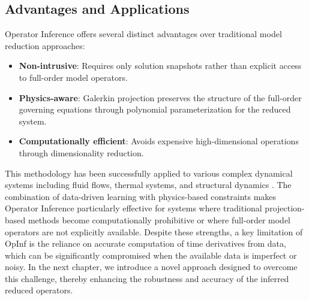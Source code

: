 \subsection*{Advantages and Applications}
Operator Inference offers several distinct advantages over traditional model reduction approaches:
\begin{itemize}
    \item \textbf{Non-intrusive}: Requires only solution snapshots rather than explicit access to full-order model operators.
    \item \textbf{Physics-aware}: Galerkin projection preserves the structure of the full-order governing equations through polynomial parameterization for the reduced system.
    \item \textbf{Computationally efficient}: Avoids expensive high-dimensional operations through dimensionality reduction.  
\end{itemize}

This methodology has been successfully applied to various complex dynamical systems including fluid flows, thermal systems, and structural dynamics \cite{ghattas2021learning,rowley2017model}. The combination of data-driven learning with physics-based constraints makes Operator Inference particularly effective for systems where traditional projection-based methods become computationally prohibitive or where full-order model operators are not explicitly available. Despite these strengths, a key limitation of OpInf is the reliance on accurate computation of time derivatives from data, which can be significantly compromised when the available data is imperfect or noisy. In the next chapter, we introduce a novel approach designed to overcome this challenge, thereby enhancing the robustness and accuracy of the inferred reduced operators.

